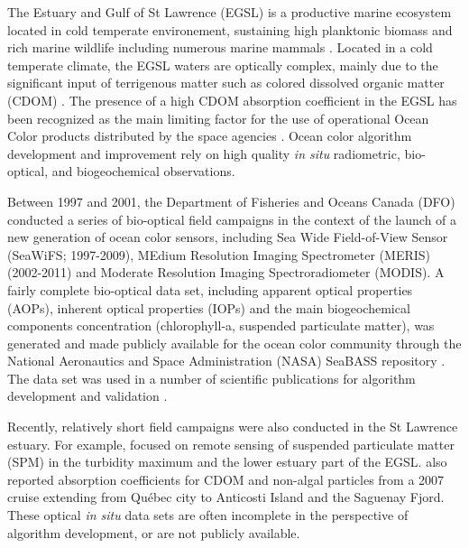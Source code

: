 \documentclass[essd, manuscript]{copernicus}
\begin{document}
\introduction  %
The Estuary and Gulf of St Lawrence (EGSL) is a productive marine ecosystem located in cold temperate environement, sustaining high planktonic biomass and rich marine wildlife including numerous marine mammals \citep{Levasseur1992, Plourde1993, Therriault1985}. Located in a cold temperate climate, the EGSL waters are optically complex, mainly due to the significant input of terrigenous matter such as colored dissolved organic matter (CDOM) \citep{Nieke1997, LeFouest2006, Cizmeli2008, Belanger2017}. The presence of a high CDOM absorption coefficient in the EGSL has been recognized as the main limiting factor for the use of operational Ocean Color products distributed by the space agencies \citep{LeFouest2006, Cizmeli2008, Laliberte2018}. Ocean color algorithm development and improvement rely on high quality \textit{in situ} radiometric, bio-optical, and biogeochemical observations. 
 
Between 1997 and 2001, the Department of Fisheries and Oceans Canada (DFO) conducted a series of bio-optical field campaigns in the context of the launch of a new generation of ocean color sensors, including Sea Wide Field-of-View Sensor (SeaWiFS; 1997-2009), MEdium Resolution Imaging Spectrometer (MERIS) (2002-2011) and Moderate Resolution Imaging Spectroradiometer (MODIS). A fairly complete bio-optical data set, including apparent optical properties (AOPs), inherent optical properties (IOPs) and the main biogeochemical components concentration (chlorophyll-a, suspended particulate matter), was generated and made publicly available for the ocean color community through the National Aeronautics and Space Administration (NASA) SeaBASS repository \citep{Werdell1999TheSeaBASS.}. The data set was used in a number of scientific publications for algorithm development and validation \citep[e.g.,][]{LeFouest2006, Yayla2009, Cizmeli2008, Larouche2010, MontesHugo2012, MontesHugo2015}. 

Recently, relatively short field campaigns were also conducted in the St Lawrence estuary. For example, \citet{Mohammadpour2015, Mohammadpour2017}  focused on remote sensing of suspended particulate matter (SPM) in the turbidity maximum and the lower estuary part of the EGSL. \citet{Xie2012} also reported absorption coefficients for CDOM and non-algal particles from a 2007 cruise extending from Québec city to Anticosti Island and the Saguenay Fjord. These optical \textit{in situ} data sets are often incomplete in the perspective of algorithm development, or are not publicly available. 
 
\end{document}
